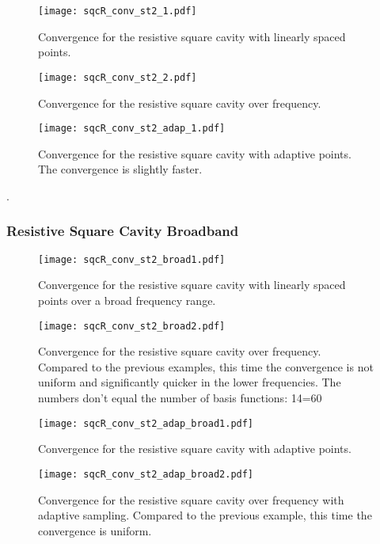 \begin{figure}[h]
	\centering
	\texttt{[image: sqcR\_conv\_st2\_1.pdf]}
	\caption{Convergence for the resistive square cavity with linearly spaced points.}
	\label{}
\end{figure}

\begin{figure}[h]
	\centering
	\texttt{[image: sqcR\_conv\_st2\_2.pdf]}
	\caption{Convergence for the resistive square cavity over frequency. }
	\label{}
\end{figure}


\begin{figure}[h]
	\centering
	\texttt{[image: sqcR\_conv\_st2\_adap\_1.pdf]}
	\caption{Convergence for the resistive square cavity with adaptive points. The convergence is slightly faster.}
	\label{}
\end{figure}


\newpage.
\subsubsection{Resistive Square Cavity Broadband}
\newpage
\begin{figure}[h]
	\centering
	\texttt{[image: sqcR\_conv\_st2\_broad1.pdf]}
	\caption{Convergence for the resistive square cavity with linearly spaced points over a broad frequency range.}
	\label{}
\end{figure}

\begin{figure}[h]
	\centering
	\texttt{[image: sqcR\_conv\_st2\_broad2.pdf]}
	\caption{Convergence for the resistive square cavity over frequency. Compared to the previous examples, this time the convergence is not uniform and significantly quicker in the lower frequencies. The numbers don't equal the number of basis functions: 14=60}
	\label{}
\end{figure}


\begin{figure}[h]
	\centering
	\texttt{[image: sqcR\_conv\_st2\_adap\_broad1.pdf]}
	\caption{Convergence for the resistive square cavity with adaptive  points.}
	\label{}
\end{figure}

\begin{figure}[h]
	\centering
	\texttt{[image: sqcR\_conv\_st2\_adap\_broad2.pdf]}
	\caption{Convergence for the resistive square cavity over frequency with adaptive sampling. Compared to the previous example, this time the convergence is uniform.}
	\label{}
\end{figure}

